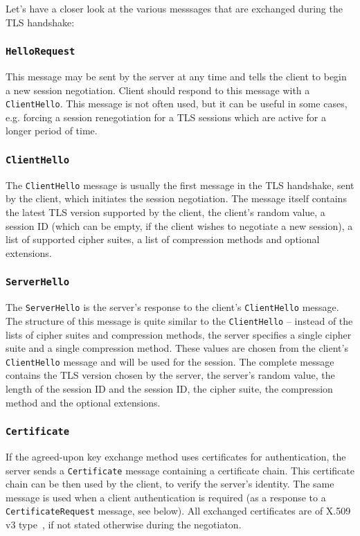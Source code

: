     Let's have a closer look at the various messsages that are exchanged during
    the TLS handshake:

\subsubsection{\texttt{HelloRequest}}
    This message may be sent by the server at any time and tells the client
    to begin a new session negotiation. Client should respond to this
    message with a \texttt{ClientHello}. This message is not often used, but
    it can be useful in some cases, e.g. forcing a session renegotiation for
    a TLS sessions which are active for a longer period of time.

\subsubsection{\texttt{ClientHello}} \label{ref:client_hello}
    The \texttt{ClientHello} message is usually the first message in the TLS
    handshake, sent by the client, which initiates the session negotiation.
    The message itself contains the latest TLS version supported by the client,
    the client's random value, a session ID (which can be empty, if the client
    wishes to negotiate a new session), a list of supported cipher suites,
    a list of compression methods and optional extensions.

\subsubsection{\texttt{ServerHello}}
    The \texttt{ServerHello} is the server's response to the client's
    \texttt{ClientHello} message. The structure of this message is quite similar
    to the \texttt{ClientHello} -- instead of the lists of cipher suites and
    compression methods, the server specifies a single cipher suite and a single
    compression method. These values are chosen from the client's \texttt{ClientHello}
    message and will be used for the session. The complete message contains
    the TLS version chosen by the server, the server's random value, the length
    of the session ID and the session ID, the cipher suite, the compression
    method and the optional extensions.

\subsubsection{\texttt{Certificate}}
    If the agreed-upon key exchange method uses certificates for authentication,
    the server sends a \texttt{Certificate} message containing a
    certificate chain. This certificate chain can be then used by the client,
    to verify the server's identity. The same message is used when a client
    authentication is required (as a response to a \texttt{CertificateRequest}
    message, see below). All exchanged certificates are of X.509 v3
    type~\cite{rfc5280}, if not stated otherwise during the negotiaton.

